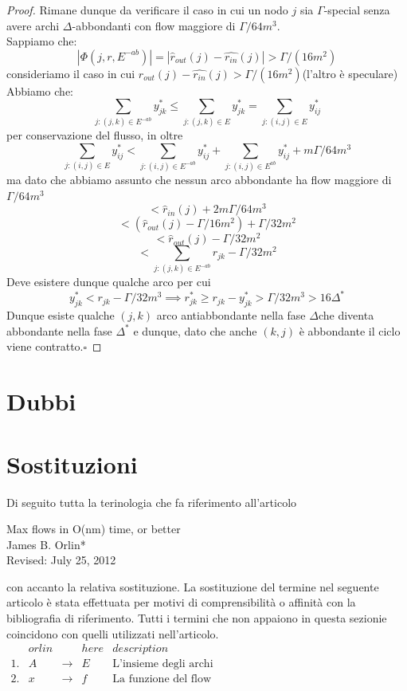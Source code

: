 \documentclass[a4paper, 11pt]{report}
\newcommand*{\QED}{\null\nobreak\hfill\ensuremath{\square}}%
\newcommand{\dlt}{$\Delta$}
\newcommand{\gmm}{$\Gamma$}
\begin{document}
\begin{proof}
    Rimane dunque da verificare il caso in cui un nodo $j$ sia \gmm-special senza avere archi $\Delta$-abbondanti con flow maggiore di $\Gamma/64m^3$.\\
    Sappiamo che:
    \[|\Phi (j, r, E^{-ab})| = |\hat{r}_{out}(j)-\hat{r_{in}}(j)|> \Gamma/(16m^2) \]
    consideriamo il caso in cui $\hat{r}_{out}(j)-\hat{r_{in}}(j)> \Gamma/(16m^2)$(l'altro è speculare)
    Abbiamo che:
    \[\sum_{j:(j,k)\in E^{-ab}}y^*_{jk} \le \sum_{j:(j,k)\in E}y^*_{jk} = \sum_{j:(i,j)\in E}y^*_{ij}\]
    per conservazione del flusso, in oltre 
    \[\sum_{j:(i,j)\in E}y^*_{ij} < \sum_{j:(i,j)\in E^{-ab}}y^*_{ij} + \sum_{j:(i,j)\in E^{ab}}y^*_{ij}+ m\Gamma/64m^3\]
    ma dato che abbiamo assunto che nessun arco abbondante ha flow maggiore di $\Gamma/64m^3$
    \[< \hat{r}_{in}(j) + 2m\Gamma/64m^3\]
    \[< (\hat{r}_{out}(j) - \Gamma/16m^2) + \Gamma/32m^2\]
    \[< \hat{r}_{out}(j) - \Gamma/32m^2\]
    \[< \sum_{j:(j,k)\in E^{-ab}}r_{jk} - \Gamma/32m^2\]
    Deve esistere dunque qualche arco per cui 
    \[y^*_{jk}<r_{jk}-\Gamma/32m^3\implies r^*_{jk}\ge r_{jk}-y^*_{jk}>\Gamma/32m^3>16\Delta^*\]
    Dunque esiste qualche $(j,k)$ arco antiabbondante nella fase \dlt che diventa abbondante nella fase $\Delta^*$ e dunque, dato che anche $(k,j)$ è abbondante il ciclo viene contratto.\QED

    


\end{proof}
\newpage
\section{Dubbi}

\section{Sostituzioni}
Di seguito tutta la terinologia che fa riferimento all'articolo
\begin{center}
    Max flows in O(nm) time, or better\\
    James B. Orlin*\\
    Revised: July 25, 2012\\
\end{center}
con accanto la relativa sostituzione. La sostituzione del termine nel seguente articolo è stata effettuata per 
motivi di comprensibilità o affinità con la bibliografia di riferimento. Tutti i termini che non appaiono in questa
 sezionie coincidono con quelli utilizzati nell'articolo.\\
$\begin{array}{lcccl}
      &orlin&          &here& description\\\hline
    1.& A & \rightarrow &E& \text{L'insieme degli archi}\\
    2.& x & \rightarrow &f& \text{La funzione del flow}
\end{array}$
\end{document}
